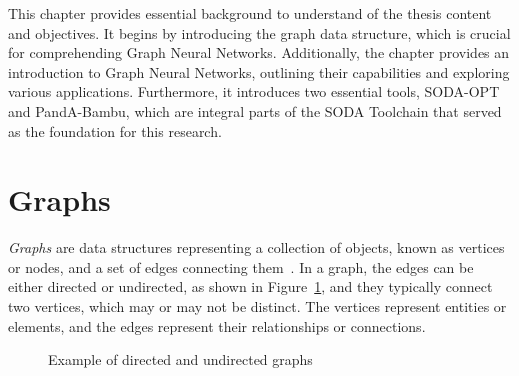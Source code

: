 This chapter provides essential background to understand of the thesis content and objectives.
It begins by introducing the graph data structure, which is crucial for comprehending Graph Neural Networks.
Additionally, the chapter provides an introduction to Graph Neural Networks, outlining their capabilities and exploring various applications.
Furthermore, it introduces two essential tools, SODA-OPT and PandA-Bambu, which are integral parts of the SODA Toolchain that served as the foundation for this research.

\section{Graphs}
\label{sec:graphs}%

\textit{Graphs} are data structures representing a collection of objects, known as vertices or nodes, and a set of edges connecting them~\cite{DBLP:journals/corr/abs-1812-08434}.
In a graph, the edges can be either directed or undirected, as shown in Figure~\ref{fig:directed_vs_undirected}, and they typically connect two vertices, which may or may not be distinct.
The vertices represent entities or elements, and the edges represent their relationships or connections.

\begin{figure}[b]
    \centering
    \hspace{0.15\textwidth}
    \caption{Example of directed and undirected graphs}
    \label{fig:directed_vs_undirected}
\end{figure}

